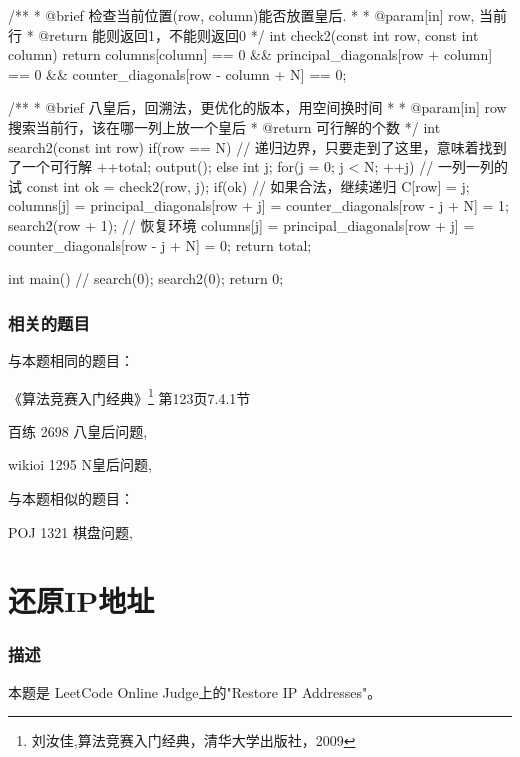 \begin{Codex}[label=eight_queen.c]
/**
 * @brief 检查当前位置(row, column)能否放置皇后.
 *
 * @param[in] row, 当前行
 * @return 能则返回1，不能则返回0
 */
int check2(const int row, const int column) {
    return columns[column] == 0 && principal_diagonals[row + column] == 0
        && counter_diagonals[row - column + N] == 0;
}

/**
 * @brief 八皇后，回溯法，更优化的版本，用空间换时间
 *
 * @param[in] row 搜索当前行，该在哪一列上放一个皇后
 * @return 可行解的个数
 */
int search2(const int row) {
    if(row == N) {  // 递归边界，只要走到了这里，意味着找到了一个可行解
        ++total;
        output();
    } else {
        int j;
        for(j = 0; j < N; ++j) {  // 一列一列的试
            const int ok = check2(row, j);
            if(ok) {  // 如果合法，继续递归
                C[row] = j;
                columns[j] = principal_diagonals[row + j] =
                    counter_diagonals[row - j + N] = 1;
                search2(row + 1);
                // 恢复环境
                columns[j] = principal_diagonals[row + j] =
                    counter_diagonals[row - j + N] = 0;
            }
        }
    }
    return total;
}

int main() {
    // search(0);
    search2(0);
    return 0;
}
\end{Codex}

\subsubsection{相关的题目}
与本题相同的题目：
\begindot
\item 《算法竞赛入门经典》\footnote{刘汝佳,算法竞赛入门经典，清华大学出版社，2009} 第123页7.4.1节
\item 百练 2698 八皇后问题, 
\item wikioi 1295 N皇后问题, 
\myenddot

与本题相似的题目：
\begindot
\item POJ 1321 棋盘问题, 
\myenddot


\section{还原IP地址} %

\subsubsection{描述}
本题是 LeetCode Online Judge上的"Restore IP Addresses"。

